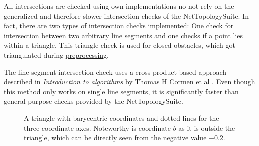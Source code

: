 				All intersections are checked using own implementations no not rely on the generalized and therefore slower intersection checks of the NetTopologySuite.
				In fact, there are two types of intersection checks implemented:
				One check for intersection between two arbitrary line segments and one checks if a point lies within a triangle.
				This triangle check is used for closed obstacles, which got triangulated during \hyperref[subsec:step-1-preprocessing]{preprocessing}.
				
				The line segment intersection check uses a cross product based approach described in \emph{Introduction to algorithms} by Thomas H Cormen et al \cite[1018]{cormen-introduction-to-alg}.
				Even though this method only works on single line segments, it is significantly faster than general purpose checks provided by the NetTopologySuite.
				
				\begin{figure}[h]
					\begin{figcenter}
					\end{figcenter}
					\caption{A triangle with barycentric coordinates and dotted lines for the three coordinate axes. Noteworthy is coordinate $b$ as it is outside the triangle, which can be directly seen from the negative value $-0.2$.}
					\label{fig:barycentric-triangle}
				\end{figure}
				
